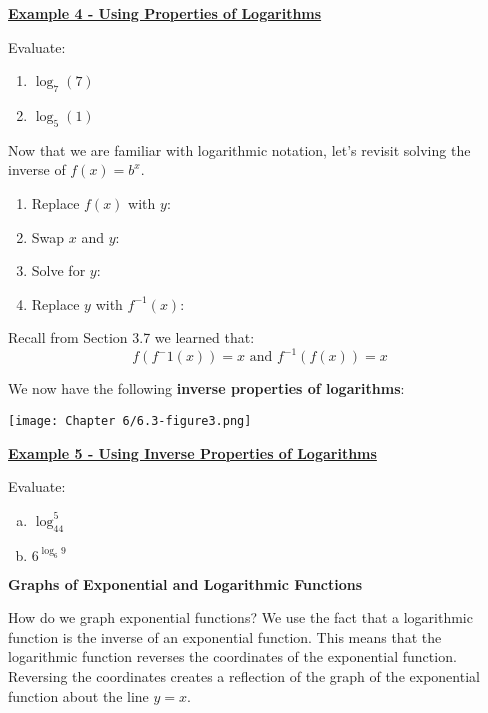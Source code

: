 \documentclass[12pt]{book}
\newcommand{\D}{\displaystyle}
\begin{document}
\underline{\textbf{Example 4 - Using Properties of Logarithms}}

Evaluate:

\begin{enumerate}
    \item $\log_7(7)$
    \vspace{5mm}
    \item $\log_5(1)$
    \vspace{5mm}
\end{enumerate}


Now that we are familiar with logarithmic notation, let's revisit solving the inverse of $f(x)=b^x$.

\begin{enumerate}
    \item Replace $f(x)$ with $y$:
    \vspace{10mm}
    \item Swap $x$ and $y$:
    \vspace{10mm}
    \item Solve for $y$:
    \vspace{10mm}
    \item Replace $y$ with $f^{-1}(x)$:
    \vspace{10mm}
\end{enumerate}

Recall from Section 3.7 we learned that: 
$$ f(f^-1(x))=x \text{ and } f^{-1}(f(x))=x$$

\newpage
We now have the following \textbf{inverse properties of logarithms}:
\vspace{1mm}

\centerline{\texttt{[image: Chapter 6/6.3-figure3.png]}}


\underline{\textbf{Example 5 - Using Inverse Properties of Logarithms}}

Evaluate:
\begin{enumerate}[(a)]
    \item $\D \log_44^5$
    \vspace{1mm}
    \item $\D 6^{\log_6 9}$
\end{enumerate}
\vspace{5mm}

{\large \textbf{Graphs of Exponential and Logarithmic Functions}}
\vspace{1mm}

How do we graph exponential functions? We use the fact that a logarithmic function is the inverse of an exponential function. This means that the logarithmic function reverses the coordinates of the exponential function. Reversing the coordinates creates a reflection of the graph of the exponential function about the line $y=x$.
\vspace{5mm}
\end{document}
